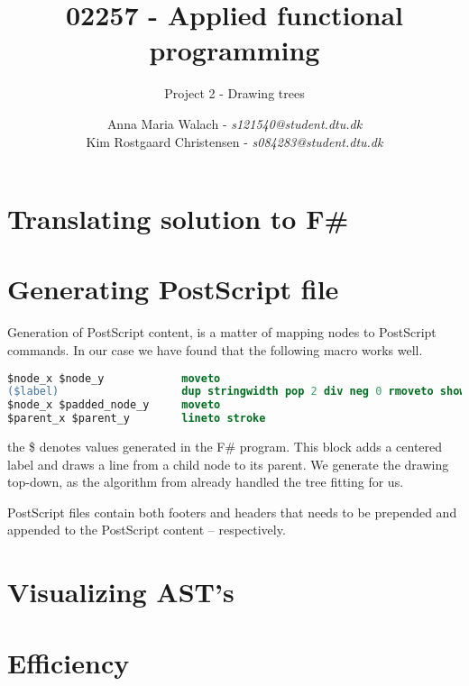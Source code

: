 \documentclass[10pt]{scrartcl}
\title{02257 - Applied functional programming}
\subtitle{Project 2 - Drawing trees}
\author{Anna Maria Walach - \textit {s121540@student.dtu.dk} \\ Kim Rostgaard Christensen - \textit {s084283@student.dtu.dk}}
\begin{document}
\maketitle
\section{Translating solution to F\#}
\section{Generating PostScript file}
Generation of PostScript content, is a matter of mapping nodes to PostScript commands. In our case we have found that the following macro works well.
\begin{lstlisting}[language=PostScript]
$node_x $node_y            moveto
($label)                   dup stringwidth pop 2 div neg 0 rmoveto show
$node_x $padded_node_y     moveto
$parent_x $parent_y        lineto stroke
\end{lstlisting}
the \$ denotes values generated in the F\# program. This block adds a centered label and draws a line from a child node to its parent.
We generate the drawing top-down, as the algorithm from \cite{kennedy1996functional} already handled the tree fitting for us.

PostScript files contain both footers and headers that needs to be prepended and appended to the PostScript content -- respectively.
\section{Visualizing AST's}
\section{Efficiency}
\end{document}
